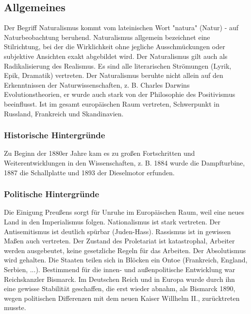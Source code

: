 \documentclass[12pt,a4paper]{article}
\begin{document}
\subsection{Allgemeines}

Der Begriff Naturalismus kommt vom lateinischen Wort "natura" (Natur) - auf Naturbeobachtung beruhend. Naturalismus allgemein bezeichnet eine Stilrichtung, bei der die Wirklichkeit ohne jegliche Ausschmückungen oder subjektive Ansichten exakt abgebildet wird. Der Naturalismus gilt auch als Radikalisierung des Realismus. Es sind alle literarischen Strömungen (Lyrik, Epik, Dramatik) vertreten. 
\newline
\newline
Der Naturalismus beruhte nicht allein auf den Erkenntnissen der Naturwissenschaften, z. B. Charles Darwins Evolutionstheorien, er wurde auch stark von der Philosophie des Positivismus beeinflusst. Ist im gesamt europäischen Raum vertreten, Schwerpunkt in Russland, Frankreich und Skandinavien.
	
\subsubsection{Historische Hintergründe}	

Zu Beginn der 1880er Jahre kam es zu großen Fortschritten und Weiterentwicklungen in den Wissenschaften, z. B. 1884 wurde die Dampfturbine, 1887 die Schallplatte und 1893 der Dieselmotor erfunden.

\subsubsection{Politische Hintergründe}

Die Einigung Preußens sorgt für Unruhe im Europäischen Raum, weil eine neues Land in den Imperialismus folgen. Nationalismus ist stark vertreten. Der Antisemitismus ist deutlich spürbar (Juden-Hass). Rassismus ist in gewissen Maßen auch vertreten. Der Zustand des Proletariat ist katastrophal, Arbeiter werden ausgebeutet, keine gesetzliche Regeln für das Arbeiten. Der Absolutismus wird gehalten. Die Staaten teilen sich in Blöcken ein Ontoe (Frankreich, England, Serbien, ...).	
\newline
Bestimmend für die innen- und außenpolitische Entwicklung war Reichskanzler Bismarck. Im Deutschen Reich und in Europa wurde durch ihn eine gewisse Stabilität geschaffen, die erst wieder abnahm, als Bismarck 1890, wegen politischen Differenzen mit dem neuen Kaiser Willhelm II., zurücktreten musste.
	
\end{document}
